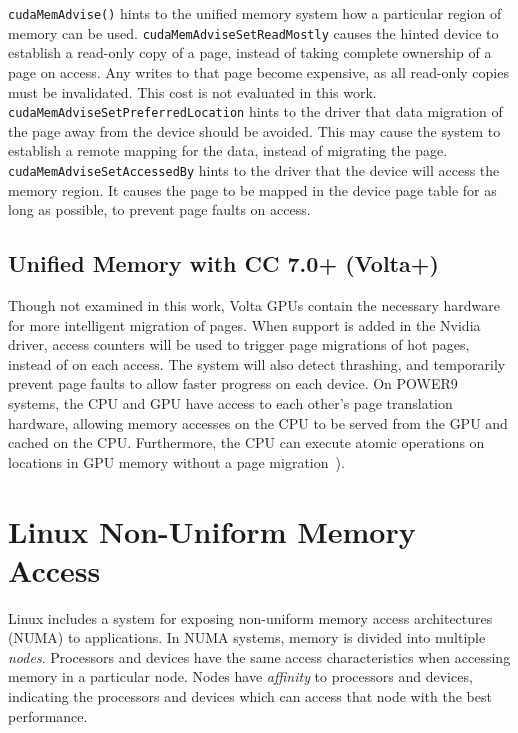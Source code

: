 \texttt{cudaMemAdvise()} hints to the unified memory system how a particular region of memory can be used.
\texttt{cudaMemAdviseSetReadMostly} causes the hinted device to establish a read-only copy of a page, instead of taking complete ownership of a page on access.
Any writes to that page become expensive, as all read-only copies must be invalidated.
This cost is not evaluated in this work.
\texttt{cudaMemAdviseSetPreferredLocation} hints to the driver that data migration of the page away from the device should be avoided.
This may cause the system to establish a remote mapping for the data, instead of migrating the page.
\texttt{cudaMemAdviseSetAccessedBy} hints to the driver that the device will access the memory region.
It causes the page to be mapped in the device page table for as long as possible, to prevent page faults on access.

\subsection {Unified Memory with CC 7.0+ (Volta+) }
Though not examined in this work, Volta GPUs contain the necessary hardware for more intelligent migration of pages.
When support is added in the Nvidia driver, access counters will be used to trigger page migrations of hot pages, instead of on each access.
The system will also detect thrashing, and temporarily prevent page faults to allow faster progress on each device.
On POWER9 systems, the CPU and GPU have access to each other's page translation hardware, allowing memory accesses on the CPU to be served from the GPU and cached on the CPU.
Furthermore, the CPU can execute atomic operations on locations in GPU memory without a page migration~\cite{sakharnykh2017unified}).

\section{Linux Non-Uniform Memory Access}
\label{sec:numa}

Linux includes a system for exposing non-uniform memory access architectures (NUMA) to applications.
In NUMA systems, memory is divided into multiple \textit{nodes}\cite{numa2012}.
Processors and devices have the same access characteristics when accessing memory in a particular node.
Nodes have \textit{affinity} to processors and devices, indicating the processors and devices which can access that node with the best performance.

